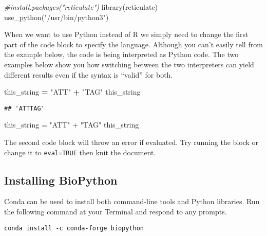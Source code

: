 \documentclass[
]{article}
\newenvironment{Shaded}{\begin{snugshade}}{\end{snugshade}}
\newcommand{\CommentTok}[1]{\textcolor[rgb]{0.56,0.35,0.01}{\textit{#1}}}
\newcommand{\FunctionTok}[1]{\textcolor[rgb]{0.00,0.00,0.00}{#1}}
\newcommand{\NormalTok}[1]{#1}
\newcommand{\OperatorTok}[1]{\textcolor[rgb]{0.81,0.36,0.00}{\textbf{#1}}}
\newcommand{\OtherTok}[1]{\textcolor[rgb]{0.56,0.35,0.01}{#1}}
\newcommand{\SpecialCharTok}[1]{\textcolor[rgb]{0.00,0.00,0.00}{#1}}
\newcommand{\StringTok}[1]{\textcolor[rgb]{0.31,0.60,0.02}{#1}}
\begin{document}
\begin{Shaded}
\begin{Highlighting}[]
\CommentTok{\#install.packages("reticulate")}
\FunctionTok{library}\NormalTok{(reticulate)}
\FunctionTok{use\_python}\NormalTok{(}\StringTok{"/usr/bin/python3"}\NormalTok{)}
\end{Highlighting}
\end{Shaded}

When we want to use Python instead of R we simply need to change the
first part of the code block to specify the language. Although you can't
easily tell from the example below, the code is being interpreted as
Python code. The two examples below show you how switching between the
two interpreters can yield different results even if the syntax is
``valid'' for both.

\begin{Shaded}
\begin{Highlighting}[]
\NormalTok{this\_string }\OperatorTok{=} \StringTok{"ATT"} \OperatorTok{+} \StringTok{"TAG"}
\NormalTok{this\_string}
\end{Highlighting}
\end{Shaded}

\begin{verbatim}
## 'ATTTAG'
\end{verbatim}

\begin{Shaded}
\begin{Highlighting}[]
\NormalTok{this\_string }\OtherTok{=} \StringTok{"ATT"} \SpecialCharTok{+} \StringTok{"TAG"}
\NormalTok{this\_string}
\end{Highlighting}
\end{Shaded}

The second code block will throw an error if evaluated. Try running the
block or change it to \texttt{eval=TRUE} then knit the document.

\hypertarget{installing-biopython}{%
\subsection{Installing BioPython}\label{installing-biopython}}

Conda can be used to install both command-line tools and Python
libraries. Run the following command at your Terminal and respond to any
prompts.

\begin{verbatim}
conda install -c conda-forge biopython
\end{verbatim}
\end{document}
